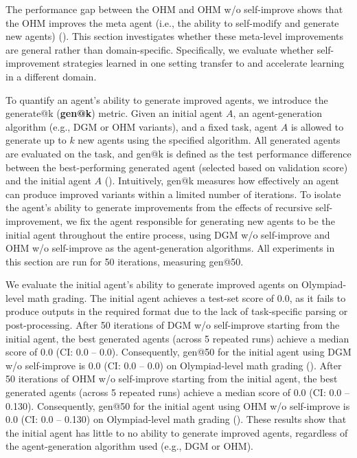 \documentclass[]{fairmeta}
\begin{document}
The performance gap between the OHM and OHM w/o self-improve shows that the OHM improves the meta agent (i.e., the ability to self-modify and generate new agents) (). This section investigates whether these meta-level improvements are general rather than domain-specific. Specifically, we evaluate whether self-improvement strategies learned in one setting transfer to and accelerate learning in a different domain.

To quantify an agent's ability to generate improved agents, we introduce the generate@k (\textbf{gen@k}) metric. Given an initial agent $A$, an agent-generation algorithm (e.g., DGM or OHM variants), and a fixed task, agent $A$ is allowed to generate up to $k$ new agents using the specified algorithm. All generated agents are evaluated on the task, and gen@k is defined as the test performance difference between the best-performing generated agent (selected based on validation score) and the initial agent $A$ (). Intuitively, gen@k measures how effectively an agent can produce improved variants within a limited number of iterations.
To isolate the agent's ability to generate improvements from the effects of recursive self-improvement, we fix the agent responsible for generating new agents to be the initial agent throughout the entire process, using DGM w/o self-improve and OHM w/o self-improve as the agent-generation algorithms. All experiments in this section are run for 50 iterations, measuring gen@50.

We evaluate the initial agent's ability to generate improved agents on Olympiad-level math grading. The initial agent achieves a test-set score of 0.0, as it fails to produce outputs in the required format due to the lack of task-specific parsing or post-processing.
After 50 iterations of DGM w/o self-improve starting from the initial agent, the best generated agents (across 5 repeated runs) achieve a median score of 0.0 (CI: 0.0 -- 0.0). Consequently, gen@50 for the initial agent using DGM w/o self-improve is 0.0 (CI: 0.0 -- 0.0) on Olympiad-level math grading ().
After 50 iterations of OHM w/o self-improve starting from the initial agent, the best generated agents (across 5 repeated runs) achieve a median score of 0.0 (CI: 0.0 -- 0.130). Consequently, gen@50 for the initial agent using OHM w/o self-improve is 0.0 (CI: 0.0 -- 0.130) on Olympiad-level math grading ().
These results show that the initial agent has little to no ability to generate improved agents, regardless of the agent-generation algorithm used (e.g., DGM or OHM).
\end{document}
